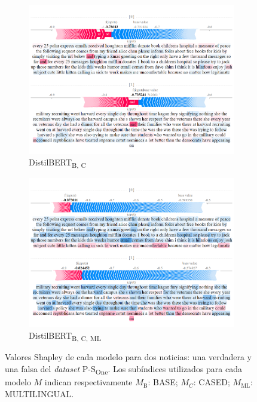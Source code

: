 \begin{figure}[!h]
    \captionsetup[subfigure]{justification=Centering}

    \begin{subfigure}[t]{0.4\textwidth}
        \includegraphics[width=\textwidth]{figs/one_TF/distil-b-c.png}
        \caption{{DistilBERT}\textsubscript{B, C}}
    \end{subfigure}
    \hspace{\fill} %
    \begin{subfigure}[t]{0.4\textwidth}
        \includegraphics[width=\linewidth]{figs/one_TF/bert-b-ml-c.png}
        \caption{{DistilBERT}\textsubscript{B, C, ML}}
    \end{subfigure}
    
    \caption{Valores Shapley de cada modelo para dos noticias: una verdadera y una falsa del \textit{dataset} {P-S}\textsubscript{One}. Los subíndices utilizados para cada modelo $M$ indican respectivamente $M_{\text{B}}$: BASE; $M_{C}$: CASED; $M_{\text{ML}}$: MULTILINGUAL.}
    \label{fig:shap-ps-one}
\end{figure}

